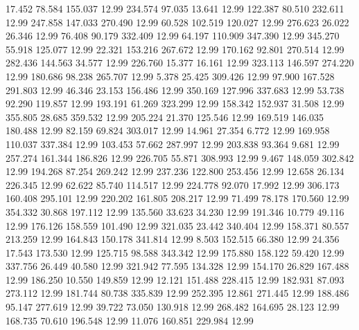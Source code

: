   17.452   78.584  155.037        12.99
 234.574   97.035   13.641        12.99
 122.387   80.510  232.611        12.99
 247.858  147.033  270.490        12.99
  60.528  102.519  120.027        12.99
 276.623   26.022   26.346        12.99
  76.408   90.179  332.409        12.99
  64.197  110.909  347.390        12.99
 345.270   55.918  125.077        12.99
  22.321  153.216  267.672        12.99
 170.162   92.801  270.514        12.99
 282.436  144.563   34.577        12.99
 226.760   15.377   16.161        12.99
 323.113  146.597  274.220        12.99
 180.686   98.238  265.707        12.99
   5.378   25.425  309.426        12.99
  97.900  167.528  291.803        12.99
  46.346   23.153  156.486        12.99
 350.169  127.996  337.683        12.99
  53.738   92.290  119.857        12.99
 193.191   61.269  323.299        12.99
 158.342  152.937   31.508        12.99
 355.805   28.685  359.532        12.99
 205.224   21.370  125.546        12.99
 169.519  146.035  180.488        12.99
  82.159   69.824  303.017        12.99
  14.961   27.354    6.772        12.99
 169.958  110.037  337.384        12.99
 103.453   57.662  287.997        12.99
 203.838   93.364    9.681        12.99
 257.274  161.344  186.826        12.99
 226.705   55.871  308.993        12.99
   9.467  148.059  302.842        12.99
 194.268   87.254  269.242        12.99
 237.236  122.800  253.456        12.99
  12.658   26.134  226.345        12.99
  62.622   85.740  114.517        12.99
 224.778   92.070   17.992        12.99
 306.173  160.408  295.101        12.99
 220.202  161.805  208.217        12.99
  71.499   78.178  170.560        12.99
 354.332   30.868  197.112        12.99
 135.560   33.623   34.230        12.99
 191.346   10.779   49.116        12.99
 176.126  158.559  101.490        12.99
 321.035   23.442  340.404        12.99
 158.371   80.557  213.259        12.99
 164.843  150.178  341.814        12.99
   8.503  152.515   66.380        12.99
  24.356   17.543  173.530        12.99
 125.715   98.588  343.342        12.99
 175.880  158.122   59.420        12.99
 337.756   26.449   40.580        12.99
 321.942   77.595  134.328        12.99
 154.170   26.829  167.488        12.99
 186.250   10.550  149.859        12.99
  12.121  151.488  228.415        12.99
 182.931   87.093  273.112        12.99
 181.744   80.738  335.839        12.99
 252.395   12.861  271.445        12.99
 188.486   95.147  277.619        12.99
  39.722   73.050  130.918        12.99
 268.482  164.695   28.123        12.99
 168.735   70.610  196.548        12.99
  11.076  160.851  229.984        12.99
